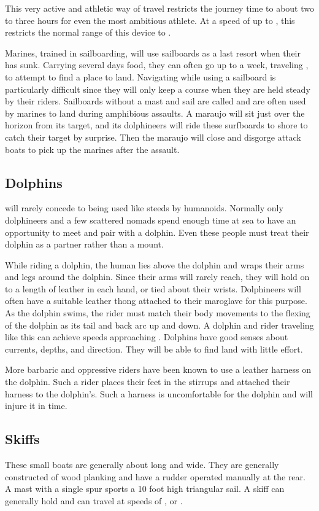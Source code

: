 \begin{multicols*}{2}
This very active and athletic way of travel restricts the journey time to about two to three hours for even the most ambitious athlete. At a speed of up to , this restricts the normal range of this device to .

Marines, trained in sailboarding, will use sailboards as a last resort when their  has sunk. Carrying several days food, they can often go up to a week, traveling , to attempt to find a place to land. Navigating while using a sailboard is particularly difficult since they will only keep a course when they are held steady by their riders.
Sailboards without a mast and sail are called  and are often used by marines to land during amphibious assaults. A maraujo will sit just over the horizon from its target, and its dolphineers will ride these surfboards to shore to catch their target by surprise. Then the maraujo will close and disgorge attack boats to pick up the marines after the assault.
\subsection{Dolphins}
 will rarely concede to being used like steeds by humanoids. Normally only dolphineers and a few scattered nomads spend enough time at sea to have an opportunity to meet and pair with a dolphin. Even these people must treat their dolphin as a partner rather than a mount.

While riding a dolphin, the human lies above the dolphin and wraps their arms and legs around the dolphin. Since their arms will rarely reach, they will hold on to a length of leather in each hand, or tied about their wrists. Dolphineers will often have a suitable leather thong attached to their maroglave for this purpose. As the dolphin swims, the rider must match their body movements to the flexing of the dolphin as its tail and back arc up and down. A dolphin and rider traveling like this can achieve speeds approaching . Dolphins have good senses about currents, depths, and direction. They will be able to find land with little effort.

More barbaric and oppressive riders have been known to use a leather harness on the dolphin. Such a rider places their feet in the stirrups and attached their harness to the dolphin's. Such a harness is uncomfortable for the dolphin and will injure it in time.
\subsection{Skiffs}
These small boats are generally about  long and  wide. They are generally constructed of wood planking and have a rudder operated manually at the rear. A mast with a single spur sports a 10 foot high triangular sail. A skiff can generally hold  and can travel at speeds of , or .


\end{multicols*}
